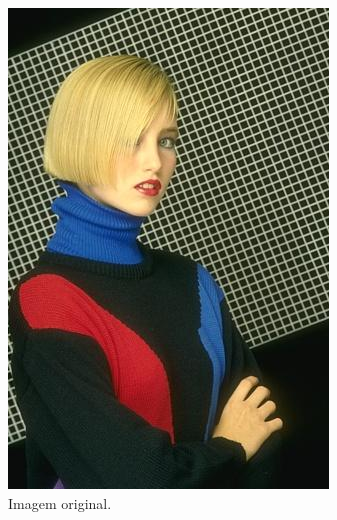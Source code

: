   \begin{figure}[!htb]
       \begin{center}  
          \includegraphics[width=0.3\columnwidth]{img/198023.jpg}
           \caption{\label{fig:Berkeley_mulher}Imagem original\citep{Arbelez2011}.}
       \end{center}
   \end{figure}

